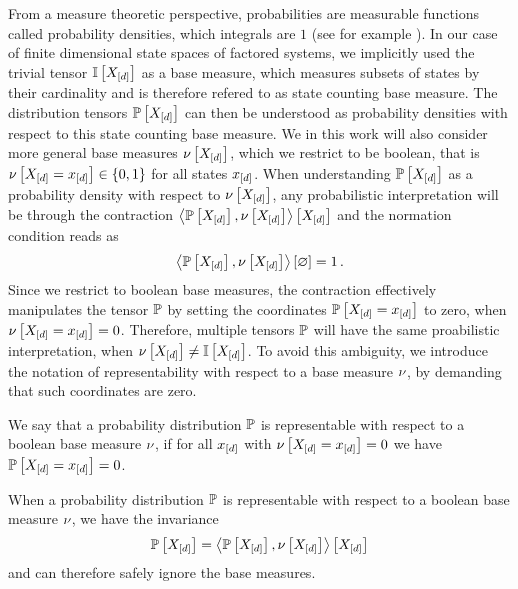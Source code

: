 From a measure theoretic perspective, probabilities are measurable functions called probability densities, which integrals are $1$ (see for example \cite{degroot_probability_2016}). %
In our case of finite dimensional state spaces of factored systems, we implicitly used the trivial tensor $\mathbb{I}\left[X_{[d]}\right]$ as a base measure, which measures subsets of states by their cardinality and is therefore refered to as state counting base measure.
The distribution tensors $\mathbb{P}\left[X_{[d]}\right]$ can then be understood as probability densities with respect to this state counting base measure.
We in this work will also consider more general base measures $\nu\left[X_{[d]}\right]$, which we restrict to be boolean, that is $\nu\left[X_{[d]}=x_{[d]}\right]\in\{0,1\}$ for all states $x_{[d]}$.
When understanding $\mathbb{P}\left[X_{[d]}\right]$ as a probability density with respect to $\nu\left[X_{[d]}\right]$, any probabilistic interpretation will be through the contraction $\left\langle \mathbb{P}\left[X_{[d]}\right],\nu\left[X_{[d]}\right]\right\rangle \left[ X_{[d]} \right]$ and the normation condition reads as
\begin{align*}
    \left\langle \mathbb{P}\left[X_{[d]}\right],\nu\left[X_{[d]}\right]\right\rangle \left[ \varnothing \right] = 1 \, .
\end{align*}
Since we restrict to boolean base measures, the contraction effectively manipulates the tensor $\mathbb{P}$ by setting the coordinates $\mathbb{P}\left[X_{[d]}=x_{[d]}\right]$ to zero, when $\nu\left[X_{[d]}=x_{[d]}\right]=0$.
Therefore, multiple tensors $\mathbb{P}$ will have the same proabilistic interpretation, when $\nu\left[X_{[d]}\right]\neq\mathbb{I}\left[X_{[d]}\right]$.
To avoid this ambiguity, we introduce the notation of representability with respect to a base measure $\nu$, by demanding that such coordinates are zero.

\begin{definition}
    \label{def:representationBaseMeasure}
    We say that a probability distribution $\mathbb{P}$ is representable with respect to a boolean base measure $\nu$, if for all $x_{[d]}$ with $\nu\left[X_{[d]}=x_{[d]}\right]=0$ we have $\mathbb{P}\left[X_{[d]}=x_{[d]}\right]=0$.
\end{definition}

When a probability distribution $\mathbb{P}$ is representable with respect to a boolean base measure $\nu$, we have the invariance
\begin{align*}
    \mathbb{P}\left[X_{[d]}\right]=\left\langle \mathbb{P}\left[X_{[d]}\right],\nu\left[X_{[d]}\right]\right\rangle \left[ X_{[d]} \right]
\end{align*}
and can therefore safely ignore the base measures.

